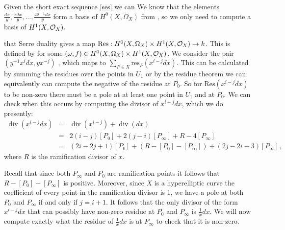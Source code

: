 \documentclass[draft, 11pt]{article} %
\theoremstyle{plain}
\theoremstyle{remark}
\newcommand{\cO}{{\cal O}}
\DeclareMathOperator{\di}{div}
\begin{document}
Given the short exact sequence \eqref{ses} we can 
We know that the elements $\frac{dx}{y}, \frac{xdx}{y}, \ldots , \frac{x^{g-1}dx}{y}$ form a basis of $H^0(X,\Omega_X)$ from \cite[\S 7, Prop. 4.26]{liu}, so we only need to compute a basis of $H^1(X,\cO_X)$.

 that Serre duality gives a map $\text{Res}: H^0(X,\Omega_X) \times H^1(X,\cO_X) \rightarrow k$.
This is defined by   for some $(\omega, f) \in   H^0(X,\Omega_X) \times H^1(X,\cO_X)$.
We consider the pair $(y^{-1}x^idx,yx^{-j})$%
, which maps to $\sum_{P\in X} \text{res}_P (x^{i-j}dx)$. 
This can be calculated by summing the residues over the points in $U_1$ or by the residue theorem we can equivalently can compute the negative of the residue at $P_0$.
So for $\text{Res}(x^{i-j}dx)$ to be non-zero there must be a pole at at least one point in $U_1$ and at $P_0$.
We can check when this occurs by computing the divisor of $x^{i-j}dx$, which we do presently:
\begin{eqnarray}
	\di(x^{i-j}dx) & = &  \di(x^{i-j}) + \di(dx) \\
	& = & 2(i-j)[P_0] +  2(j-i)[P_\infty] + R - 4[P_\infty] \\
	& = & (2i-2j+1)[P_0] +(R-[P_0]-[P_\infty]) +(2j-2i-3)[P_\infty],
\end{eqnarray}
where $R$ is the ramification divisor of $x$.

Recall that since both $P_\infty$ and $P_0$ are ramification points it follows that $R-[P_0]-[P_\infty]$ is positive.
Moreover, since $X$ is a hyperelliptic curve the coefficient of every point in the ramification divisor is 1, we have a pole at both $P_0$ and $P_\infty$ if and only if $j=i+1$.
It follows that the only divisor of the form $x^{i-j}dx$ that can possibly have non-zero residue at $P_0$ and $P_\infty$ is $\frac{1}{x}dx$.
We will now compute exactly what the residue of $\frac{1}{x}dx$ is at $P_\infty$ to check that it is non-zero.
\end{document}
